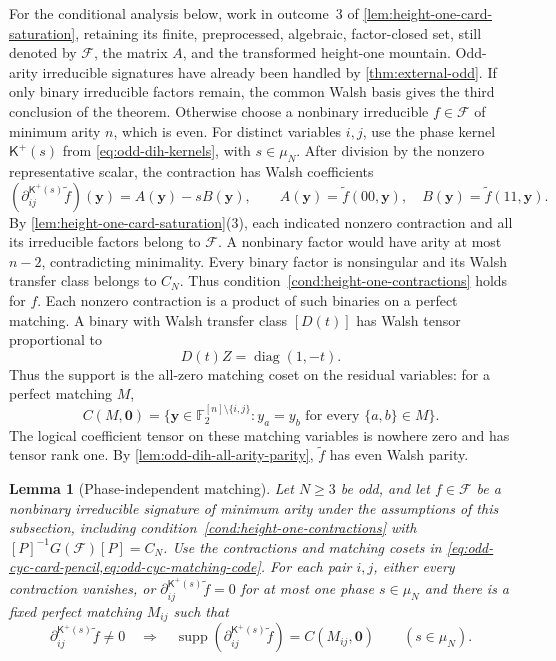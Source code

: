 \documentclass[11pt,letterpaper,onecolumn]{article}
\theoremstyle{plain}
\newtheorem{lemma}[lemma]{Lemma}
\theoremstyle{definition}
\theoremstyle{remark}
\newcommand{\Ftwo}{\mathbb F_2}
\newcommand{\cF}{\mathcal F}
\newcommand{\diag}{\operatorname{diag}}
\newcommand{\supp}{\operatorname{supp}}
\begin{document}
	For the conditional analysis below, work in outcome~3 of
	\cref{lem:height-one-card-saturation}, retaining its finite, preprocessed,
	algebraic, factor-closed set, still denoted by \(\cF\), the matrix \(A\), and the
	transformed height-one mountain.  Odd-arity irreducible signatures have
	already been handled by \cref{thm:external-odd}.  If only binary irreducible factors remain, the common Walsh basis gives
	the third conclusion of the theorem. Otherwise choose a nonbinary
	irreducible \(f\in\cF\) of minimum arity \(n\), which is even.
	For distinct variables \(i,j\), use the phase kernel \(\mathsf K^+(s)\)
    from \cref{eq:odd-dih-kernels}, with \(s\in\mu_N\).
    After division by the nonzero representative scalar, the contraction has Walsh coefficients
	\begin{equation}
		(\partial_{ij}^{\mathsf K^+(s)}\widetilde f)({\mathbf y})=A({\mathbf y})-sB({\mathbf y}),
		\qquad
		A({\mathbf y})=\widetilde f(00,{\mathbf y}),
		\quad B({\mathbf y})=\widetilde f(11,{\mathbf y}).
		\label{eq:odd-cyc-card-pencil}
	\end{equation}
	By \cref{lem:height-one-card-saturation}\textnormal{(3)}, each indicated
	nonzero contraction and all its irreducible factors belong
	to \(\cF\).  A nonbinary factor would have arity at most \(n-2\),
	contradicting minimality.  Every binary factor is nonsingular and its Walsh
	transfer class belongs to \(C_N\).  Thus
	condition~\ref{cond:height-one-contractions} holds for \(f\). Each nonzero
	contraction is a product of such binaries on a perfect matching.  A binary with Walsh transfer class \([D(t)]\) has
	Walsh tensor proportional to
	\[
	D(t)Z=\diag(1,-t).
	\]
Thus the support is the all-zero matching coset on the residual variables:
	for a perfect matching \(M\),
	\begin{equation}
		C(M,\mathbf0)=\{{\mathbf y}\in\Ftwo^{[n]\setminus\{i,j\}}:
		y_a=y_b\text{ for every }\{a,b\}\in M\}.
		\label{eq:odd-cyc-matching-code}
	\end{equation}
	The logical coefficient tensor on these matching variables is nowhere zero
    and has tensor rank one.  By
	\cref{lem:odd-dih-all-arity-parity}, \(\widetilde f\) has even Walsh
	parity.
	
	\begin{lemma}[Phase-independent matching]
		\label{lem:odd-cyc-one-matching}
		Let \(N\ge3\) be odd, and let \(f\in\cF\) be a nonbinary
		irreducible signature of minimum arity under the assumptions of this
		subsection, including condition~\ref{cond:height-one-contractions} with
		\([P]^{-1}G(\cF)[P]=C_N\).  Use the contractions and matching cosets in \cref{eq:odd-cyc-card-pencil,eq:odd-cyc-matching-code}.  For each pair
		\(i,j\), either every contraction vanishes, or \(\partial_{ij}^{\mathsf K^+(s)}\widetilde f=0\) for at most one
		phase \(s\in\mu_N\) and there is a fixed perfect matching \(M_{ij}\)
		such that
		\begin{equation*}
			\partial_{ij}^{\mathsf K^+(s)}\widetilde f\ne0
			\quad\Longrightarrow\quad
			\supp(\partial_{ij}^{\mathsf K^+(s)}\widetilde f)=C(M_{ij},\mathbf0)
			\qquad(s\in\mu_N).
		\end{equation*}
	\end{lemma}
	
\end{document}
